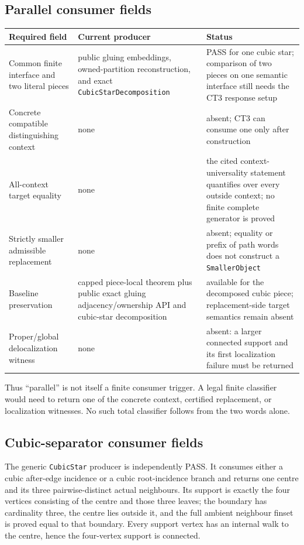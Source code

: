 \documentclass[11pt]{article}
\begin{document}
\subsection*{Parallel consumer fields}
\begin{longtable}{p{}p{}p{}}
\toprule
Required field & Current producer & Status \\
\midrule
Common finite interface and two literal pieces & public gluing embeddings,
owned-partition reconstruction, and exact \texttt{CubicStarDecomposition} &
PASS for one cubic star; comparison of two pieces on one semantic interface
still needs the CT3 response setup \\
Concrete compatible distinguishing context & none & absent; CT3 can consume
one only after construction \\
All-context target equality & none & the cited context-universality statement
quantifies over every outside context; no finite complete generator is proved
\\
Strictly smaller admissible replacement & none & absent; equality or prefix
of path words does not construct a \texttt{SmallerObject} \\
Baseline preservation & capped piece-local theorem plus public exact gluing
adjacency/ownership API and cubic-star decomposition & available for the
decomposed cubic piece; replacement-side target semantics remain absent \\
Proper/global delocalization witness & none & absent: a larger connected
support and its first localization failure must be returned \\
\bottomrule
\end{longtable}
Thus ``parallel'' is not itself a finite consumer trigger.  A legal finite
classifier would need to return one of the concrete context, certified
replacement, or localization witnesses.  No such total classifier follows
from the two words alone.

\subsection*{Cubic-separator consumer fields}
The generic \texttt{CubicStar} producer is independently PASS.  It consumes
either a cubic after-edge incidence or a cubic root-incidence branch and
returns one centre and its three pairwise-distinct actual neighbours.  Its
support is exactly the four vertices consisting of the centre and those three
leaves; the boundary has cardinality three, the centre lies outside it, and
the full ambient neighbour finset is proved equal to that boundary.  Every
support vertex has an internal walk to the centre, hence the four-vertex
support is connected.
\end{document}

